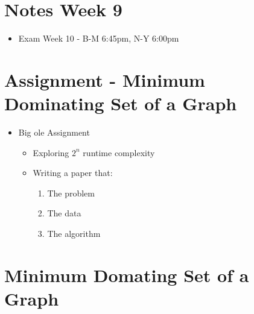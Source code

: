 \documentclass[12pt]{article}
\begin{document}
\section*{Notes Week 9}

\begin{itemize}

    \item Exam Week 10 - B-M 6:45pm, N-Y 6:00pm

\end{itemize}

\section*{Assignment - Minimum Dominating Set of a Graph}

\begin{itemize}

	\item Big ole Assignment
	\begin{itemize}
		\item Exploring $2^n$ runtime complexity
		\item Writing a paper that:
		\begin{enumerate}
			\item The problem
			\item The data
			\item The algorithm
		\end{enumerate}
	\end{itemize}

\end{itemize}

\section*{Minimum Domating Set of a Graph}
\end{document}

